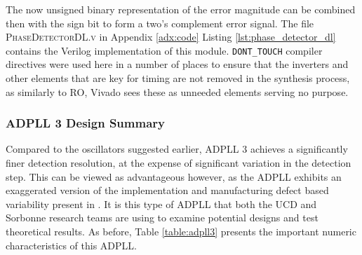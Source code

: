 The now unsigned binary representation of the error magnitude can be combined then with the sign bit to form a two's complement error signal. The file \textsc{PhaseDetectorDL.v} in Appendix \ref{adx:code} Listing \ref{lst:phase_detector_dl} contains the Verilog implementation of this module. \texttt{DONT\_TOUCH} compiler directives were used here in a number of places to ensure that the inverters and other elements that are key for timing are not removed in the synthesis process, as similarly to \ac{RO}, Vivado sees these as unneeded elements serving no purpose.

\subsubsection{\acs{ADPLL} 3 Design Summary}
Compared to the oscillators suggested earlier, \ac{ADPLL} 3 achieves a significantly finer detection resolution, at the expense of significant variation in the detection step. This can be viewed as advantageous however, as the \ac{ADPLL} exhibits an exaggerated version of the implementation and manufacturing defect based variability present in . It is this type of \ac{ADPLL} that both the \acs{UCD} and Sorbonne research teams are using to examine potential designs and test theoretical results. As before, Table \ref{table:adpll3} presents the important numeric characteristics of this \ac{ADPLL}.


